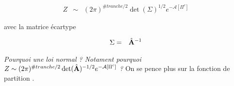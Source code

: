 \begin{eqnarray}
	Z &\sim  &(2 \pi)^{\# tranche/2}  \det ( \Sigma )^{1/2} e^{-\mathcal{A}[\Pi^c]}		
\end{eqnarray}

\begin{aff}
avec la matrice écartype 

\begin{eqnarray}
	\Sigma & =& \hat{\mathbf{A}}^{-1} 	
\end{eqnarray}	
\end{aff}

	
	{\em Pourquoi une loi normal ? Notament pourquoi $Z \sim (2 \pi)^{\# tranche/2}  \det (\hat{\mathbf{A}} )^{-1/2} e^{-\mathcal{A}[\Pi^c]}$ ?} On se pence plus sur la fonction de partition .